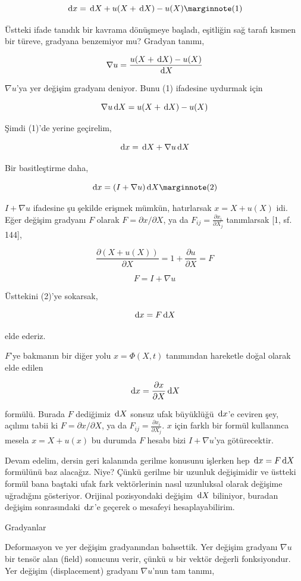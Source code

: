 \documentclass[12pt,fleqn]{article}\usepackage{../../common}
\begin{document}
$$
\ud x = \ud X + u(X+\ud X) - u(X)
\mlabel{1}
$$

Üstteki ifade tanıdık bir kavrama dönüşmeye başladı, eşitliğin sağ tarafı kısmen
bir türeve, gradyana benzemiyor mu? Gradyan tanımı,

$$
\nabla u = \frac{u(X+\,\mathrm{d} X) - u(X)}{\,\mathrm{d} X}
$$

$\nabla u$'ya yer değişim gradyanı deniyor.  Bunu (1) ifadesine uydurmak için 

$$
\nabla u \,\mathrm{d} X = u(X+\,\mathrm{d} X) - u(X)
$$


Şimdi (1)'de yerine geçirelim,

$$
\,\mathrm{d} x = \,\mathrm{d} X + \nabla u \,\mathrm{d} X
$$

Bir basitleştirme daha,

$$
\ud x = (I + \nabla u) \ud X
\mlabel{2}
$$

$I + \nabla u$ ifadesine şu şekilde erişmek mümkün, hatırlarsak
$x = X + u(X)$ idi. Eğer değişim gradyanı $F$ olarak $F = \partial x / \partial X$,
ya da $F_{ij} = \frac{\partial x_i}{\partial X_j}$ tanımlarsak [1, sf. 144], 

$$
\frac{\partial (X + u(X))}{\partial X} = 1  + \frac{\partial u}{\partial X} = F
$$

$$
F = I + \nabla u
$$

Üsttekini (2)'ye sokarsak,

$$
\,\mathrm{d} x = F \,\mathrm{d} X
$$

elde ederiz.

$F$'ye bakmanın bir diğer yolu $x = \Phi(X,t)$ tanımından hareketle doğal olarak
elde edilen

$$
\,\mathrm{d} x = \frac{\partial x}{\partial X} \,\mathrm{d} X
$$

formülü. Burada $F$ dediğimiz $\,\mathrm{d} X$ sonsuz ufak büyüklüğü $\,\mathrm{d} x$'e ceviren
şey, açılımı tabii ki $F = \partial x / \partial X$, ya da $F_{ij} = \frac{\partial x_i}{\partial X_j}$.
$x$ için farklı bir formül kullanınca mesela $x = X + u(x)$ bu durumda $F$
hesabı bizi $I + \nabla u$'ya götürecektir.

Devam edelim, dersin geri kalanında gerilme konusunu işlerken hep
$\,\mathrm{d} x = F \,\mathrm{d} X$ formülünü baz alacağız. Niye?  Çünkü gerilme bir uzunluk
değişimidir ve üstteki formül bana baştaki ufak fark vektörlerinin nasıl
uzunluksal olarak değişime uğradığını gösteriyor. Orijinal pozisyondaki
değişim $\,\mathrm{d} X$ biliniyor, buradan değişim sonrasındaki $\,\mathrm{d} x$'e geçerek
o mesafeyi hesaplayabilirim.


Gradyanlar

Deformasyon ve yer değişim gradyanından bahsettik. Yer değişim gradyanı $\nabla
u$ bir tensör alan (field) sonucunu verir, çünkü $u$ bir vektör değerli
fonksiyondur. Yer değişim (displacement) gradyanı $\nabla u$'nun tam tanımı,
\end{document}
